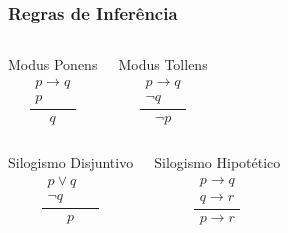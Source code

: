 \documentclass{beamer}
\begin{document}
\begin{frame}
\frametitle{Regras de Inferência}

	\begin{columns}[c]
	\large
\begin{block}{Modus Ponens}
	\large
	\begin{equation*}
	\frac{\begin{array}{l} p \rightarrow q \\ p\end{array}}{q}
	\end{equation*}
\end{block}	

\begin{block}{ Modus Tollens}
	\large
	\begin{equation*}
	\frac{\begin{array}{l} p \rightarrow q \\ \neg q\end{array}}{\neg p}
	\end{equation*}
\end{block}	
\end{columns}\vfill

	\begin{columns}[c]
	\large
	\begin{block}{Silogismo Disjuntivo}
		\large
		\begin{equation*}
	\frac{\begin{array}{ll} p \vee q & \\ \neg q & ~~\end{array}}{p}	
		\end{equation*}
	\end{block}
	
	\begin{block}{Silogismo Hipotético}
		\large
		\begin{equation*}
	\frac{\begin{array}{l} p \rightarrow q \\ q \rightarrow r \end{array}}{p \rightarrow r}	
		\end{equation*}
	\end{block}	
\end{columns}
\end{frame}
\end{document}
